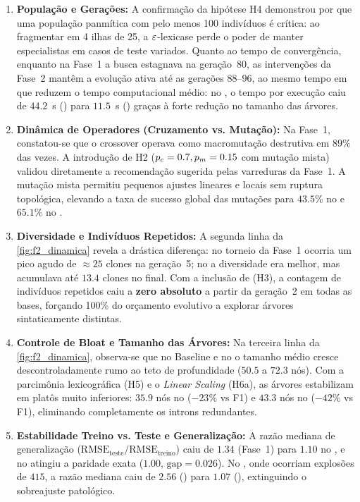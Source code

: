 \begin{enumerate}
  \item \textbf{População e Gerações:}
        A confirmação da hipótese H4 demonstrou por que uma população
        panmítica com pelo menos 100 indivíduos é crítica: ao fragmentar
         em 4 ilhas de 25, a $\varepsilon$-lexicase perde o poder de
        manter especialistas em casos de teste variados. Quanto ao tempo de
        convergência, enquanto na Fase~1 a busca estagnava na geração~80, as
        intervenções da Fase~2 mantêm a evolução ativa até as gerações 88--96,
        ao mesmo tempo em que reduzem o tempo computacional médio: no
        , o tempo por execução caiu de $44.2$~s () para
        $11.5$~s () graças à forte redução no tamanho das árvores.
  \item \textbf{Dinâmica de Operadores (Cruzamento vs. Mutação):}
        Na Fase~1, constatou-se que o crossover operava como macromutação
        destrutiva em $89\%$ das vezes. A introdução de H2 ($p_c=0.7,p_m=0.15$
        com mutação mista) validou diretamente a recomendação sugerida pelas
        varreduras da Fase~1. A mutação mista permitiu pequenos ajustes
        lineares e locais sem ruptura topológica, elevando a taxa de sucesso
        global das mutações para $43.5\%$ no  e $65.1\%$ no
        .
  \item \textbf{Diversidade e Indivíduos Repetidos:}
        A segunda linha da \cref{fig:f2_dinamica} revela a drástica diferença:
        no torneio da Fase~1 ocorria um pico agudo de $\approx 25$ clones na
        geração~5; no  a diversidade era melhor, mas acumulava até
        $13.4$ clones no final. Com a inclusão de  (H3), a contagem
        de indivíduos repetidos caiu a \textbf{zero absoluto} a partir da
        geração~2 em todas as bases, forçando 100\% do orçamento evolutivo a
        explorar árvores sintaticamente distintas.
  \item \textbf{Controle de Bloat e Tamanho das Árvores:}
        Na terceira linha da \cref{fig:f2_dinamica}, observa-se que no
        Baseline e no  o tamanho médio cresce descontroladamente
        rumo ao teto de profundidade ($50.5$ a $72.3$ nós). Com a parcimônia
        lexicográfica (H5) e o \emph{Linear Scaling} (H6a), as árvores
        estabilizam em platôs muito inferiores: $35.9$ nós no 
        ($-23\%$ vs F1) e $43.3$ nós no  ($-42\%$ vs F1),
        eliminando completamente os introns redundantes.
  \item \textbf{Estabilidade Treino vs. Teste e Generalização:}
        A razão mediana de generalização ($\text{RMSE}_{\text{teste}} / \text{RMSE}_{\text{treino}}$)
        caiu de $1.34$ (Fase~1) para $1.10$ no , e no 
        atingiu a paridade exata ($1.00$, $\text{gap} = 0.026$). No ,
        onde ocorriam explosões de $415$, a razão mediana caiu de $2.56$
        () para $1.07$ (), extinguindo o sobreajuste
        patológico.
\end{enumerate}
